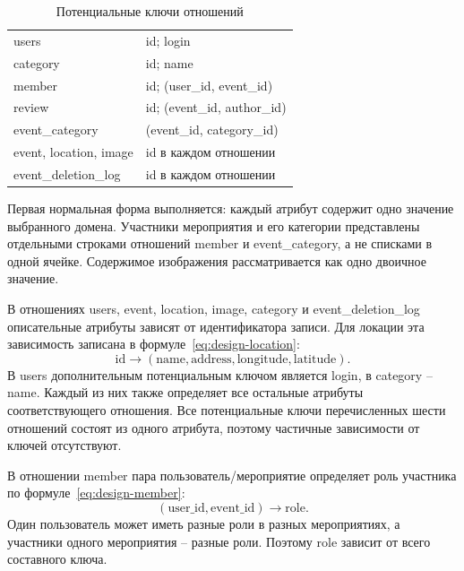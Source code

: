 \begin{table}[H]
    \caption{Потенциальные ключи отношений}
    \label{tab:design-keys}
    \small
    \begin{tabularx}{\textwidth}{|L{5.6cm}|Y|}
        \hline
         &
         \\
        \hline
        users & id; login \\
        \hline
        category & id; name \\
        \hline
        member & id; (user\_id, event\_id) \\
        \hline
        review & id; (event\_id, author\_id) \\
        \hline
        event\_category & (event\_id, category\_id) \\
        \hline
        event, location, image & id в каждом отношении \\
        \hline
        event\_deletion\_log & id в каждом отношении \\
        \hline
    \end{tabularx}
\end{table}

Первая нормальная форма выполняется: каждый атрибут содержит одно значение выбранного домена. Участники мероприятия и его категории представлены отдельными строками отношений member и event\_category, а не списками в одной ячейке. Содержимое изображения рассматривается как одно двоичное значение.

В отношениях users, event, location, image, category и event\_deletion\_log описательные атрибуты зависят от идентификатора записи. Для локации эта зависимость записана в формуле~\eqref{eq:design-location}:
\begin{equation}
    \text{id} \rightarrow (\text{name}, \text{address}, \text{longitude}, \text{latitude}).
    \label{eq:design-location}
\end{equation}
В users дополнительным потенциальным ключом является login, в category -- name. Каждый из них также определяет все остальные атрибуты соответствующего отношения. Все потенциальные ключи перечисленных шести отношений состоят из одного атрибута, поэтому частичные зависимости от ключей отсутствуют.

В отношении member пара пользователь/мероприятие определяет роль участника по формуле~\eqref{eq:design-member}:
\begin{equation}
    (\text{user\_id}, \text{event\_id}) \rightarrow \text{role}.
    \label{eq:design-member}
\end{equation}
Один пользователь может иметь разные роли в разных мероприятиях, а участники одного мероприятия -- разные роли. Поэтому role зависит от всего составного ключа.

